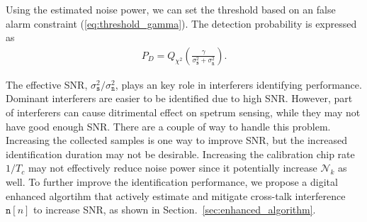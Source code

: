 \documentclass{IEEEtran}
\newtheorem{proposition}{Proposition}
\begin{document}
Using the estimated noise power, we can set the threshold based on an false alarm constraint (\ref{eq:threshold_gamma}). The detection probability is expressed as
\begin{align}
P_D = Q_{\chi^2}\left(\frac{\gamma}{\sigma^2_{\mathtt{s}}+\sigma^2_{\mathtt{n}}}\right).
\end{align}

The effective SNR, $\sigma_{\mathtt{s}}^2/\sigma_{\mathtt{n}}^2$, plays an key role in interferers identifying performance. Dominant interferers are easier to be identified due to high SNR. However, part of interferers can cause ditrimental effect on spetrum sensing, while they may not have good enough SNR. There are a couple of way to handle this problem. Increasing the collected samples is one way to improve SNR, but the increased identification duration may not be desirable. Increasing the calibration chip rate $1/T_c$ may not effectively reduce noise power since it potentially increase $\mathcal{N}_k$ as well. To further improve the identification performance, we propose a digital enhanced algortihm that actively estimate and mitigate cross-talk interference $\mathtt{n}[n]$ to increase SNR, as shown in Section.~\ref{sec:enhanced_algorithm}.


\end{document}

